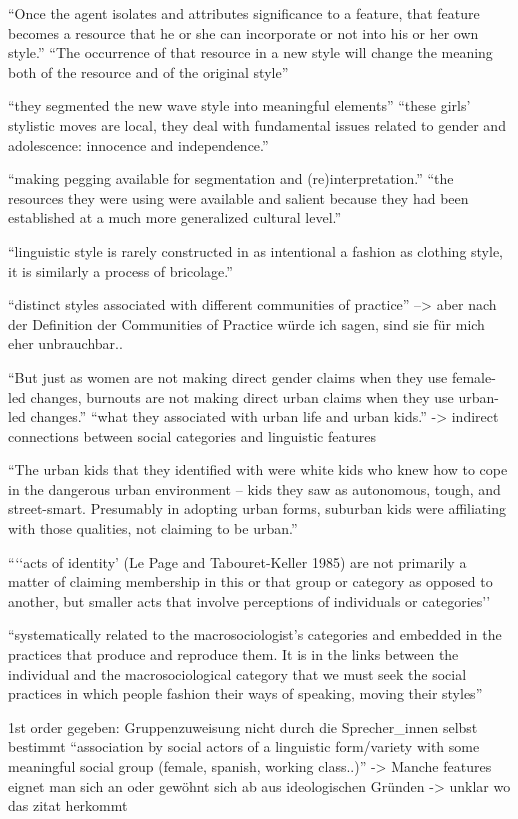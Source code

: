 ``Once the agent
isolates and attributes significance to a feature, that feature becomes a resource
that he or she can incorporate or not into his or her own style.''
``The occurrence
of that resource in a new style will change the meaning both of the resource and
of the original style''

``they segmented the new wave style into meaningful elements''
``these girls’ stylistic moves are local,
they deal with fundamental issues related to gender and adolescence: innocence
and independence.''

``making pegging available for segmentation and (re)interpretation.''
``the resources they were using
were available and salient because they had been established at a much more
generalized cultural level.''

``linguistic style is rarely constructed in as intentional a fashion
as clothing style, it is similarly a process of bricolage.''

``distinct styles associated with different communities of practice''
--> aber nach der Definition der Communities of Practice würde ich sagen, sind sie für mich eher unbrauchbar..

``But just as women are not making direct gender claims when they use female-
led changes, burnouts are not making direct urban claims when they use
urban-led changes.''
``what they associated with urban life and urban kids.''
-> indirect connections between social categories and linguistic features

``The urban kids that they identified with were white kids who knew
how to cope in the dangerous urban environment – kids they saw as autonomous,
tough, and street-smart. Presumably in adopting urban forms, suburban kids
were affiliating with those qualities, not claiming to be urban.''

```‘acts of identity’ (Le Page and Tabouret-Keller 
1985) are not primarily a matter of claiming membership in this or that group
or category as opposed to another, but smaller acts that involve perceptions of
individuals or categories''

``systematically related to the macrosociologist’s categories
and embedded in the practices that produce and reproduce them. It is in the
links between the individual and the macrosociological category that we must
seek the social practices in which people fashion their ways of speaking, moving
their styles''


1st order
gegeben: Gruppenzuweisung
nicht durch die Sprecher\_innen selbst bestimmt
``association by social actors of a linguistic form/variety with some meaningful social group (female, spanish, working class..)''
-> Manche features eignet man sich an oder gewöhnt sich ab aus ideologischen Gründen
-> unklar wo das zitat herkommt


